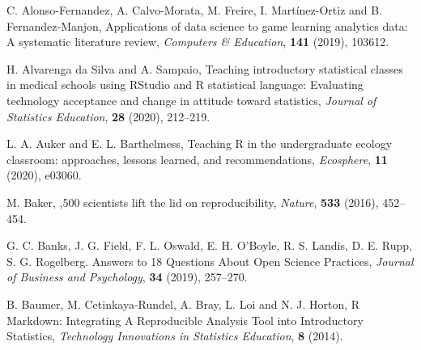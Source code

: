 \documentclass{aims} %
\theoremstyle{definition}
\begin{document}





\begin{thebibliography}{99}
%

     \newblock  C. Alonso-Fernandez,  A. Calvo-Morata, M. Freire, I. Martínez-Ortiz and B. Fernandez-Manjon,
     \newblock Applications of data science to game learning analytics data: A systematic literature review,
     \newblock \emph{Computers \& Education}, \textbf{141} (2019), 103612.

     \newblock  H. Alvarenga da Silva and A. Sampaio,
     \newblock Teaching introductory statistical classes in medical schools using RStudio and R statistical language: Evaluating technology acceptance and change in attitude toward statistics,
     \newblock \emph{Journal of Statistics Education}, \textbf{28} (2020), 212--219.

     \newblock  L. A. Auker and E. L. Barthelmess,
     \newblock Teaching R in the undergraduate ecology classroom: approaches, lessons learned, and recommendations,
     \newblock \emph{Ecosphere}, \textbf{11} (2020), e03060.

     \newblock  M. Baker,
     ,500 scientists lift the lid on reproducibility,
     \newblock \emph{Nature}, \textbf{533} (2016), 452--454.

     \newblock  G. C. Banks, J. G. Field, F. L. Oswald, E. H. O'Boyle, R. S. Landis, D. E. Rupp, S. G. Rogelberg.
     \newblock Answers to 18 Questions About Open Science Practices,
     \newblock \emph{Journal of Business and Psychology}, \textbf{34} (2019), 257--270.

     \newblock B. Baumer, M. Cetinkaya-Rundel, A. Bray, L. Loi and N. J. Horton,
     \newblock R Markdown: Integrating A Reproducible Analysis Tool into Introductory Statistics,
     \newblock \emph{Technology Innovations in Statistics Education}, \textbf{8} (2014).


\end{thebibliography}
\end{document}
